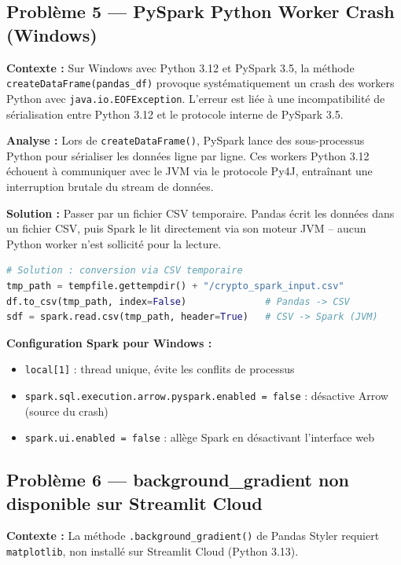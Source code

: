 \documentclass[12pt,a4paper]{article}
\begin{document}
\subsection{Problème 5 — PySpark Python Worker Crash (Windows)}
\textbf{Contexte :} Sur Windows avec Python 3.12 et PySpark 3.5, la méthode \texttt{createDataFrame(pandas\_df)} provoque systématiquement un crash des workers Python avec \texttt{java.io.EOFException}. L'erreur est liée à une incompatibilité de sérialisation entre Python 3.12 et le protocole interne de PySpark 3.5.

\textbf{Analyse :} Lors de \texttt{createDataFrame()}, PySpark lance des sous-processus Python pour sérialiser les données ligne par ligne. Ces workers Python 3.12 échouent à communiquer avec le JVM via le protocole Py4J, entraînant une interruption brutale du stream de données.

\textbf{Solution :} Passer par un fichier CSV temporaire. Pandas écrit les données dans un fichier CSV, puis Spark le lit directement via son moteur JVM -- aucun Python worker n'est sollicité pour la lecture.

\begin{lstlisting}[language=Python]
# Solution : conversion via CSV temporaire
tmp_path = tempfile.gettempdir() + "/crypto_spark_input.csv"
df.to_csv(tmp_path, index=False)              # Pandas -> CSV
sdf = spark.read.csv(tmp_path, header=True)   # CSV -> Spark (JVM)
\end{lstlisting}

\textbf{Configuration Spark pour Windows :}
\begin{itemize}[noitemsep]
    \item \texttt{local[1]} : thread unique, évite les conflits de processus
    \item \texttt{spark.sql.execution.arrow.pyspark.enabled = false} : désactive Arrow (source du crash)
    \item \texttt{spark.ui.enabled = false} : allège Spark en désactivant l'interface web
\end{itemize}

\subsection{Problème 6 — background\_gradient non disponible sur Streamlit Cloud}
\textbf{Contexte :} La méthode \texttt{.background\_gradient()} de Pandas Styler requiert \texttt{matplotlib}, non installé sur Streamlit Cloud (Python 3.13).
\end{document}
